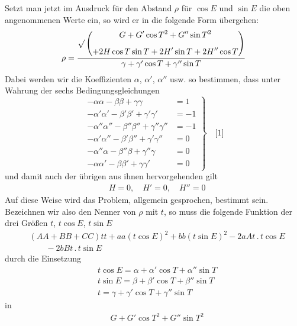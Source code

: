 \begingroup
\renewcommand{\arraystretch}{1.45}

Setzt man jetzt im Ausdruck für den Abstand $\rho$ für $\cos E$ und $\sin E$ die oben angenommenen Werte ein, so wird er in die folgende Form übergehen:
\[
\rho=\frac{\surd\left(\begin{gathered}G+G'\cos T^2+G''\sin T^2\\[5pt]
+2H\cos T\sin T+2H'\sin T+2H''\cos T\end{gathered}\right)}{\gamma+\gamma'\cos T+\gamma''\sin T}
\]
Dabei werden wir die Koeffizienten $\alpha$, $\alpha'$, $\alpha''$ usw. so bestimmen, dass unter Wahrung der sechs Bedingungsgleichungen
\[
\left.\begin{aligned}
-\alpha\alpha-\beta\beta+\gamma\gamma&=1\\[5pt]
-\alpha'\alpha'-\beta'\beta'+\gamma'\gamma'&=-1\\[5pt]
-\alpha''\alpha''-\beta''\beta''+\gamma''\gamma''&=-1\\[5pt]
-\alpha'\alpha''-\beta'\beta''+\gamma'\gamma''&=0\\[5pt]
-\alpha''\alpha-\beta''\beta+\gamma''\gamma&=0\\[5pt]
-\alpha\alpha'-\beta\beta'+\gamma\gamma'&=0
\end{aligned}\right\}\quad\text{[1]}
\]
und damit auch der übrigen aus ihnen hervorgehenden gilt
\[
\begin{aligned}
&H=0,\quad H'=0,\quad H''=0
\end{aligned}
\]
Auf diese Weise wird das Problem, allgemein gesprochen, bestimmt sein. Bezeichnen wir also den Nenner von $\rho$ mit $t$, so muss die folgende Funktion der drei Größen $t$, $t\cos E$, $t\sin E$
\[
\begin{aligned}
&(AA+BB+CC)tt+aa(t\cos E)^2+bb(t\sin E)^2-2aAt\, .\, t\cos E\\[6pt]
&\qquad{}-2bBt\, .\, t\sin E
\end{aligned}
\]
durch die Einsetzung
\[
\begin{aligned}
&t\cos E=\alpha+\alpha'\cos T+\alpha''\sin T\\[6pt]
&t\sin E=\beta+\beta'\cos T+\beta''\sin T\\[6pt]
&t=\gamma+\gamma'\cos T+\gamma''\sin T
\end{aligned}
\]
in
\[
\begin{aligned}
&G+G'\cos T^2+G''\sin T^2
\end{aligned}
\]
